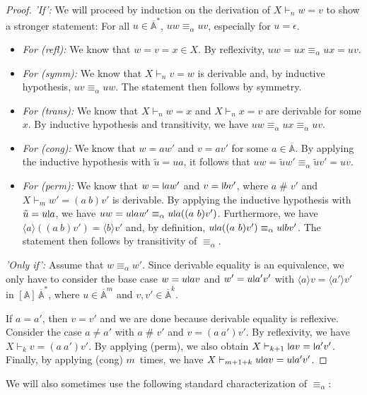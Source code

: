 \documentclass[a4paper,UKenglish,cleveref,thm-restate,numberwithinsect,final]{lipics-v2021}
\newcommand{\Names}{\mathbb{A}}
\newcommand{\barNames}{\overline{\Names}}
\newcommand{\alphaeq}{\equiv_\alpha}
\newcommand{\fresh}{\mathbin{\#}}
\newcommand{\bind}[1]{\langle #1\rangle}
\theoremstyle{plain}
\newcommand{\midmid}{\hspace{0.2ex}{\rule[-0.1ex]{0.6pt}{1.65ex}}\hspace{0.2ex}}
\newcommand{\newletter}[1]{{\midmid}#1}
\numberwithin{equation}{section}
\newcommand{\+}[1]{\mathcal{#1}\xspace}
\theoremstyle{definition}
\begin{document}
\begin{proof}
  \emph{'If':}
  We will proceed by induction on the derivation of \(X \vdash_n w = v\) to show a stronger statement:
  For all \(u\in \barNames^*\), \(uw \alphaeq uv\), especially for \(u = \epsilon\).
  \begin{itemize}
  \item \emph{For (refl):}
    We know that \(w = v = x \in X\).
    By reflexivity, \(uw = ux \alphaeq ux = uv\).
  \item \emph{For (symm):}
    We know that \(X \vdash_n v = w\) is derivable and, by inductive hypothesis, \(uv \alphaeq uw\).
    The statement then follows by symmetry.
  \item \emph{For (trans):}
    We know that \(X \vdash_n w = x\) and \(X \vdash_n x = v\) are derivable for some \(x\).
    By inductive hypothesis and transitivity, we have \(uw \alphaeq ux \alphaeq uv\).
  \item \emph{For (cong):}
    We know that \(w = aw'\) and \(v = av'\) for some \(a\in \barNames\).
    By applying the inductive hypothesis with \(\tilde{u} = ua\), it follows that \(uw = \tilde{u}w' \alphaeq \tilde{u}v' = uv\).
  \item \emph{For (perm):}
    We know that \(w = \newletter{a}w'\) and \(v = \newletter{b}v'\), where \(a \fresh v'\) and \(X \vdash_{m} w' = (a\ b)v'\) is derivable.
    By applying the inductive hypothesis with \(\tilde{u} = u\newletter{a}\), we have \(uw = u\newletter{a}w' \alphaeq u\newletter{a}((a\ b)v')\).
    Furthermore, we have \(\bind{a}((a\ b)v') = \bind{b}v'\) and, by definition, \(u\newletter{a}((a\ b)v') \alphaeq u\newletter{b}v'\).
    The statement then follows by transitivity of \(\alphaeq\).
  \end{itemize}

  \noindent\emph{'Only if':}
  Assume that \(w \alphaeq w'\). Since derivable equality is an equivalence, we only have to consider the base case \(w = u\newletter{a}v\) and \(w' = u\newletter{a'}v'\) with \(\bind{a}v = \bind{a'}v'\) in \([\Names]\,\barNames^*\), where \(u\in \barNames^m\) and \(v, v' \in \barNames^k\).

  If \(a = a'\), then \(v = v'\) and we are done because derivable equality is reflexive.
  Consider the case \(a \neq a'\) with \(a\fresh v'\) and \(v = (a\ a')v'\).
  By reflexivity, we have \(X \vdash_k v = (a\ a')v'\).
  By applying (perm), we also obtain \(X \vdash_{k + 1} \newletter{a}v = \newletter{a'}v'\).
  Finally, by applying (cong) $m$~times, we have \(X \vdash_{m + 1 + k} u\newletter{a}v = u\newletter{a'}v'\).
\end{proof}
We will also sometimes use the following standard characterization of \(\alphaeq\):
\end{document}
